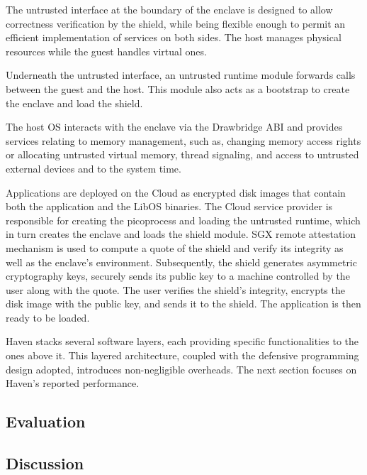 The untrusted interface at the boundary of the enclave is designed to allow correctness verification by the shield, while being flexible enough to permit an efficient implementation of services on both sides.
The host manages physical resources while the guest handles virtual ones.

Underneath the untrusted interface, an untrusted runtime module forwards calls between the guest and the host.
This module also acts as a bootstrap to create the enclave and load the shield.

The host OS interacts with the enclave via the Drawbridge ABI and provides services relating to memory management, such as, changing memory access rights or allocating untrusted virtual memory, thread signaling, and access to untrusted external devices and to the system time.

Applications are deployed on the Cloud as encrypted disk images that contain both the application and the LibOS binaries.
The Cloud service provider is responsible for creating the picoprocess and loading the untrusted runtime, which in turn creates the enclave and loads the shield module.
SGX remote attestation mechanism is used to compute a quote of the shield and verify its integrity as well as the enclave's environment.
Subsequently, the shield generates asymmetric cryptography keys, securely sends its public key to a machine controlled by the user along with the quote.
The user verifies the shield's integrity, encrypts the disk image with the public key, and sends it to the shield.
The application is then ready to be loaded.

Haven stacks several software layers, each providing specific functionalities to the ones above it.
This layered architecture, coupled with the defensive programming design adopted, introduces non-negligible overheads.
The next section focuses on Haven's reported performance.


\subsection{Evaluation}



\subsection{Discussion}






